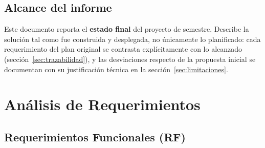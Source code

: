 \documentclass[12pt,a4paper]{article}
\begin{document}
\subsection{Alcance del informe}
Este documento reporta el \textbf{estado final} del proyecto de semestre. Describe la solución tal como fue construida y desplegada, no únicamente lo planificado: cada requerimiento del plan original se contrasta explícitamente con lo alcanzado (sección~\ref{sec:trazabilidad}), y las desviaciones respecto de la propuesta inicial se documentan con su justificación técnica en la sección~\ref{sec:limitaciones}.

\newpage
\section{Análisis de Requerimientos}

\subsection{Requerimientos Funcionales (RF)}
\end{document}
